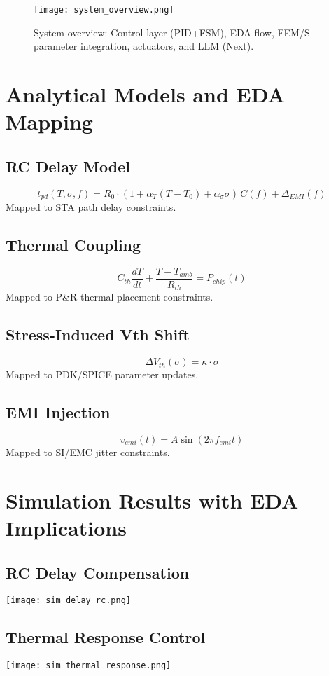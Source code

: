 \documentclass[conference]{IEEEtran}
\begin{document}
\begin{figure}[h]
  \centering
  \texttt{[image: system\_overview.png]}
  \caption{System overview: Control layer (PID+FSM), EDA flow, FEM/S-parameter integration, actuators, and LLM (Next).}
\end{figure}

\section{Analytical Models and EDA Mapping}
\subsection{RC Delay Model}
\[
t_{pd}(T,\sigma,f) = R_0 \cdot (1+\alpha_T (T-T_0)+\alpha_\sigma \sigma)\,C(f)+\Delta_{EMI}(f)
\]
Mapped to STA path delay constraints.

\subsection{Thermal Coupling}
\[
C_{th}\frac{dT}{dt} + \frac{T-T_{amb}}{R_{th}} = P_{chip}(t)
\]
Mapped to P\&R thermal placement constraints.

\subsection{Stress-Induced Vth Shift}
\[
\Delta V_{th}(\sigma)=\kappa \cdot \sigma
\]
Mapped to PDK/SPICE parameter updates.

\subsection{EMI Injection}
\[
v_{emi}(t)=A\sin(2\pi f_{emi} t)
\]
Mapped to SI/EMC jitter constraints.

\section{Simulation Results with EDA Implications}
\subsection{RC Delay Compensation}
\texttt{[image: sim\_delay\_rc.png]}

\subsection{Thermal Response Control}
\texttt{[image: sim\_thermal\_response.png]}
\end{document}
